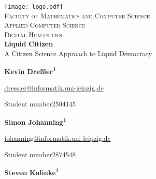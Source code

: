 \begin{titlepage}	%
	\begin{center}
		\libertineOsF
		\vspace*{0.1cm}
		\texttt{[image: logo.pdf]}\\[0.75cm]
		\normalsize{\textsc{Faculty of Mathematics and Computer Science\\Applied Computer Science\\Digital Humanities}}\\[0.75cm]
		\Huge{\textbf{Liquid Citizen}}\\[0.25cm]
		\Large{A Citizen Science Approach to Liquid Democracy}\\[0.75cm]
		\textit{\normalsize{}}
		
	\vspace*{\fill} 
	\begin{minipage}[t]{.6\textwidth}
		\large{\textbf{Kevin Dreßler\textsuperscript{1}}} \vspace*{0.3cm}
		
		\begin{normalsize}
			\href{mailto:dressler@informatik.uni-leipzig.de}{dressler@informatik.uni-leipzig.de} %
			
			\libertineLF
			{\footnotesize Student number\enspace{}2504145} \vspace*{1cm}
		\end{normalsize}
	\end{minipage}%
	\begin{minipage}[t]{.4\textwidth}
		\large{\textbf{Simon Johanning\textsuperscript{1}}} \vspace*{0.3cm}
		
		\begin{normalsize}
			\href{mailto:johanning@informatik.uni-leipzig.de}{johanning@informatik.uni-leipzig.de} %
			
			\libertineLF
			{\footnotesize Student number\enspace{}2874548} \vspace*{1cm}
		\end{normalsize}
	\end{minipage}
		\begin{minipage}[t]{.6\textwidth}
		\large{\textbf{Steven Kalinke\textsuperscript{1}}} \vspace*{0.3cm}
		

\end{minipage}
\end{center}
\end{titlepage}
